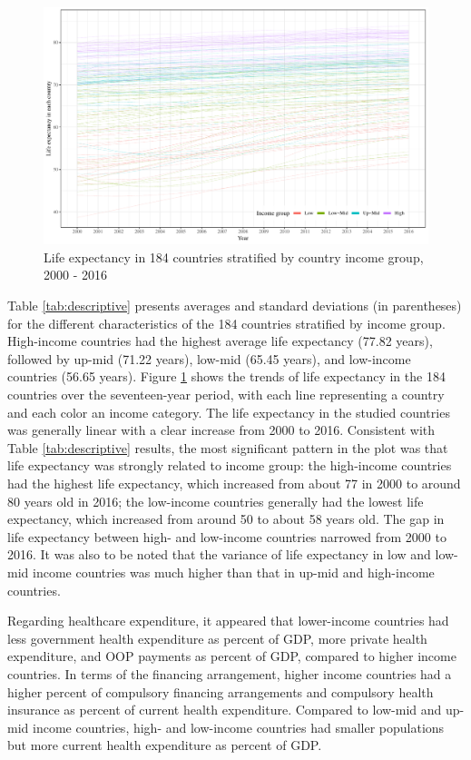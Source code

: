 \documentclass[]{elsarticle} %
\makeatletter
\def\maxwidth{\ifdim\Gin@nat@width>\linewidth\linewidth
\else\Gin@nat@width\fi}
\let\Oldincludegraphics\includegraphics
\renewcommand{\includegraphics}[1]{\Oldincludegraphics[width=\maxwidth]{#1}}
\makeatother
\begin{document}
\begin{figure}
\centering
\includegraphics{Figures/fig1.pdf}
\caption{\label{fig:fig1}Life expectancy in 184 countries stratified by country income group, 2000 - 2016}
\end{figure}

Table \ref{tab:descriptive} presents averages and standard deviations (in parentheses) for the different characteristics of the 184 countries stratified by income group.
High-income countries had the highest average life expectancy (77.82 years), followed by up-mid (71.22 years), low-mid (65.45 years), and low-income countries (56.65 years).
Figure \ref{fig:fig1} shows the trends of life expectancy in the 184 countries over the seventeen-year period, with each line representing a country and each color an income category.
The life expectancy in the studied countries was generally linear with a clear increase from 2000 to 2016.
Consistent with Table \ref{tab:descriptive} results, the most significant pattern in the plot was that life expectancy was strongly related to income group: the high-income countries had the highest life expectancy, which increased from about 77 in 2000 to around 80 years old in 2016;
the low-income countries generally had the lowest life expectancy, which increased from around 50 to about 58 years old.
The gap in life expectancy between high- and low-income countries narrowed from 2000 to 2016.
It was also to be noted that the variance of life expectancy in low and low-mid income countries was much higher than that in up-mid and high-income countries.

Regarding healthcare expenditure, it appeared that lower-income countries had less government health expenditure as percent of GDP, more private health expenditure, and OOP payments as percent of GDP, compared to higher income countries. In terms of the financing arrangement, higher income countries had a higher percent of compulsory financing arrangements and compulsory health insurance as percent of current health expenditure. Compared to low-mid and up-mid income countries, high- and low-income countries had smaller populations but more current health expenditure as percent of GDP.
\end{document}
